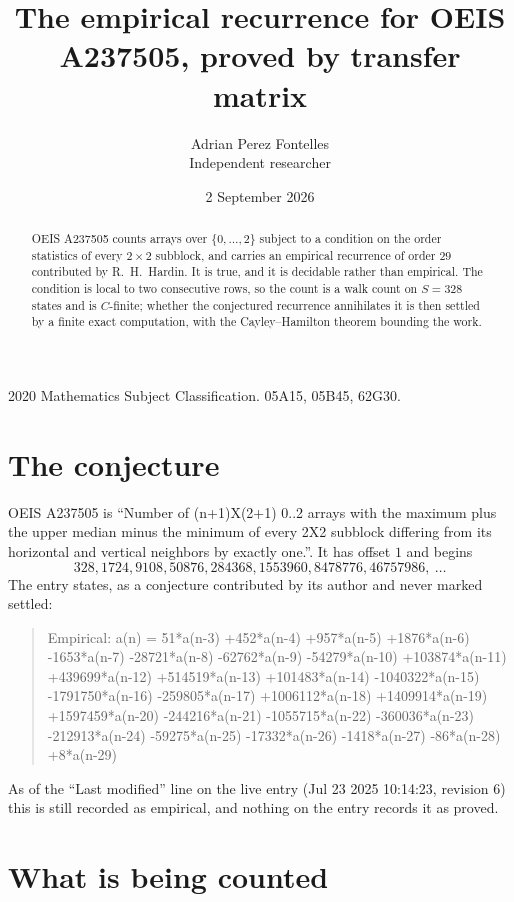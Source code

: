 \documentclass[11pt,a4paper]{article}
\title{The empirical recurrence for OEIS A237505, proved by transfer matrix}
\author{Adrian Perez Fontelles\\ \small Independent researcher}
\date{2 September 2026}
\theoremstyle{plain}
\theoremstyle{definition}
\begin{document}
\maketitle

\begin{abstract}
OEIS A237505 counts arrays over $\{0,\dots,2\}$ subject to a condition on the order
statistics of every $2\times2$ subblock, and carries an empirical recurrence of order
$29$ contributed by R.~H.~Hardin. It is true, and it is decidable rather than empirical.
The condition is local to two consecutive rows, so the count is a walk count on $S=328$
states and is $C$-finite; whether the conjectured recurrence annihilates it is then settled by
a finite exact computation, with the Cayley--Hamilton theorem bounding the work.
\end{abstract}

\noindent\small 2020 Mathematics Subject Classification. 05A15, 05B45, 62G30.\normalsize

\section{The conjecture}

OEIS A237505 is ``Number of (n+1)X(2+1) 0..2 arrays with the maximum plus the upper median minus the minimum of every 2X2 subblock differing from its horizontal and vertical neighbors by exactly one.''. It has offset $1$ and begins
\[
328, 1724, 9108, 50876, 284368, 1553960, 8478776, 46757986,\ \dots
\]
The entry states, as a conjecture contributed by its author and never marked settled:
\begin{quote}
Empirical: a(n) = 51*a(n-3) +452*a(n-4) +957*a(n-5) +1876*a(n-6) -1653*a(n-7) -28721*a(n-8) -62762*a(n-9) -54279*a(n-10) +103874*a(n-11) +439699*a(n-12) +514519*a(n-13) +101483*a(n-14) -1040322*a(n-15) -1791750*a(n-16) -259805*a(n-17) +1006112*a(n-18) +1409914*a(n-19) +1597459*a(n-20) -244216*a(n-21) -1055715*a(n-22) -360036*a(n-23) -212913*a(n-24) -59275*a(n-25) -17332*a(n-26) -1418*a(n-27) -86*a(n-28) +8*a(n-29)
\end{quote}
As of the ``Last modified'' line on the live entry (Jul 23 2025 10:14:23, revision 6) this is still
recorded as empirical, and nothing on the entry records it as proved.

\section{What is being counted}
\end{document}

